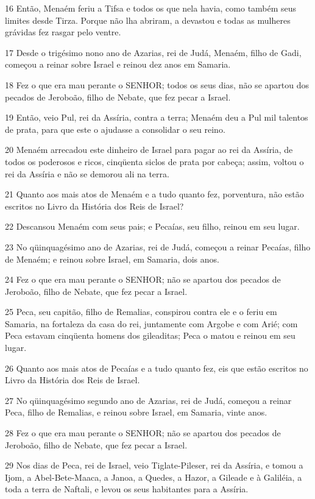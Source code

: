 \par 16 Então, Menaém feriu a Tifsa e todos os que nela havia, como também seus limites desde Tirza. Porque não lha abriram, a devastou e todas as mulheres grávidas fez rasgar pelo ventre.
\par 17 Desde o trigésimo nono ano de Azarias, rei de Judá, Menaém, filho de Gadi, começou a reinar sobre Israel e reinou dez anos em Samaria.
\par 18 Fez o que era mau perante o SENHOR; todos os seus dias, não se apartou dos pecados de Jeroboão, filho de Nebate, que fez pecar a Israel.
\par 19 Então, veio Pul, rei da Assíria, contra a terra; Menaém deu a Pul mil talentos de prata, para que este o ajudasse a consolidar o seu reino.
\par 20 Menaém arrecadou este dinheiro de Israel para pagar ao rei da Assíria, de todos os poderosos e ricos, cinqüenta siclos de prata por cabeça; assim, voltou o rei da Assíria e não se demorou ali na terra.
\par 21 Quanto aos mais atos de Menaém e a tudo quanto fez, porventura, não estão escritos no Livro da História dos Reis de Israel?
\par 22 Descansou Menaém com seus pais; e Pecaías, seu filho, reinou em seu lugar.
\par 23 No qüinquagésimo ano de Azarias, rei de Judá, começou a reinar Pecaías, filho de Menaém; e reinou sobre Israel, em Samaria, dois anos.
\par 24 Fez o que era mau perante o SENHOR; não se apartou dos pecados de Jeroboão, filho de Nebate, que fez pecar a Israel.
\par 25 Peca, seu capitão, filho de Remalias, conspirou contra ele e o feriu em Samaria, na fortaleza da casa do rei, juntamente com Argobe e com Arié; com Peca estavam cinqüenta homens dos gileaditas; Peca o matou e reinou em seu lugar.
\par 26 Quanto aos mais atos de Pecaías e a tudo quanto fez, eis que estão escritos no Livro da História dos Reis de Israel.
\par 27 No qüinquagésimo segundo ano de Azarias, rei de Judá, começou a reinar Peca, filho de Remalias, e reinou sobre Israel, em Samaria, vinte anos.
\par 28 Fez o que era mau perante o SENHOR; não se apartou dos pecados de Jeroboão, filho de Nebate, que fez pecar a Israel.
\par 29 Nos dias de Peca, rei de Israel, veio Tiglate-Pileser, rei da Assíria, e tomou a Ijom, a Abel-Bete-Maaca, a Janoa, a Quedes, a Hazor, a Gileade e à Galiléia, a toda a terra de Naftali, e levou os seus habitantes para a Assíria.
